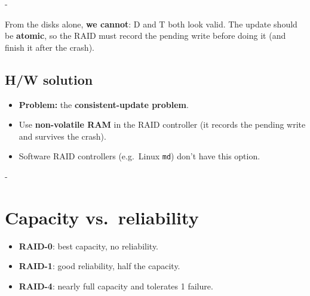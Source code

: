 \documentclass[11pt,a4paper]{article}
\makeatletter
\newcommand{\keepspace}[1]{\par\penalty-100\begingroup
  \setlength{\dimen@}{#1}\dimen@ii\pagegoal\advance\dimen@ii-\pagetotal
  \ifdim\dimen@>\dimen@ii\ifdim\dimen@ii>\z@\vfil\fi\break\fi\endgroup}
\makeatother
\begin{document}
\keepspace{9\baselineskip}
\begin{quizbox}
From the disks alone, \textbf{we cannot}: D and T both look valid. The
update should be \textbf{atomic}, so the RAID must record the pending write
before doing it (and finish it after the crash).
\end{quizbox}

\subsection{H/W solution}

\begin{keybox}
\begin{itemize}
  \item \textbf{Problem:} the \textbf{consistent-update problem}.
  \item Use \textbf{non-volatile RAM} in the RAID controller (it records the
        pending write and survives the crash).
  \item Software RAID controllers (e.g.\ Linux \texttt{md}) don't have this
        option.
\end{itemize}
\end{keybox}

\keepspace{9\baselineskip}
\section{Capacity vs.\ reliability}

\begin{center}
\begin{minipage}{0.45\textwidth}\centering
{}
\end{minipage}\hfill
\begin{minipage}{0.5\textwidth}
\begin{itemize}
  \item \textbf{RAID-0}: best capacity, no reliability.
  \item \textbf{RAID-1}: good reliability, half the capacity.
  \item \textbf{RAID-4}: nearly full capacity and tolerates 1 failure.
\end{itemize}
\end{minipage}
\end{center}
\end{document}
